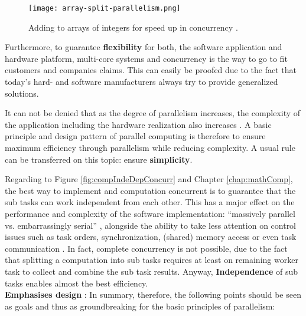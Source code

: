 \newpage

\begin{figure}[h!]
	\centering
	\texttt{[image: array-split-parallelism.png]}
	\caption{
		Adding to arrays of integers for speed up in concurrency \parencite[see][p3]{internet2}.
	}
	\label{fig:arraySplit}
\end{figure}

\noindent Furthermore, to guarantee \textbf{flexibility} for both, the software application and hardware platform, multi-core systems and concurrency is the way to go to fit customers and companies claims. This can easily be proofed due to the fact that today's hard- and software manufacturers always try to provide generalized solutions.   

It can not be denied that as the degree of parallelism increases, the complexity of the application including the hardware realization also increases \parencite{article14} \parencite{article6}. A basic principle and design pattern of parallel computing is therefore to ensure maximum efficiency through parallelism while reducing complexity. A usual rule can be transferred on this topic: ensure \textbf{simplicity}.

Regarding to Figure \ref{fig:compIndeDepConcurr} and Chapter \ref{chap:mathComp}, the best way to implement and computation concurrent is to guarantee that the sub tasks can work independent from each other. This has a major effect on the performance and complexity of the software implementation: ``massively parallel vs. embarrassingly serial'' \parencite[see][p15]{article6}, alongside the ability to take less attention on control issues such as task orders, synchronization, (shared) memory access or even task communication \parencite{internet1}. In fact, complete concurrency is not possible, due to the fact that splitting a computation into sub tasks requires at least on remaining worker task to collect and combine the sub task results. Anyway, \textbf{Independence} of sub tasks enables almost the best efficiency.\\

\noindent \textbf{Emphasises design}  \parencite[see][p5]{article6}: In summary, therefore, the following points should be seen as goals and thus as groundbreaking for the basic principles of parallelism:

